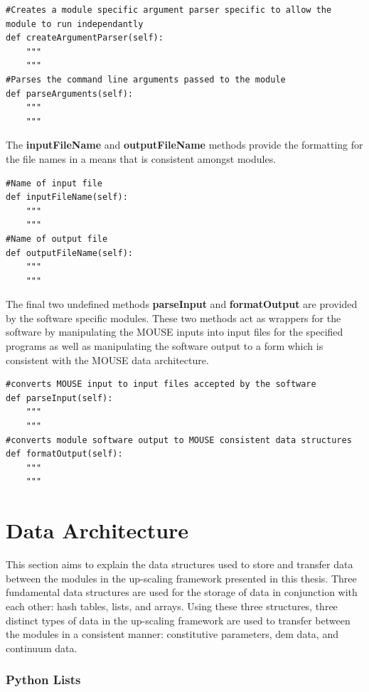 \begin{lstlisting}[frame=single] 
#Creates a module specific argument parser specific to allow the module to run independantly   
def createArgumentParser(self):
	"""
	"""
#Parses the command line arguments passed to the module
def parseArguments(self):
	"""
	"""
\end{lstlisting}

The \textbf{inputFileName} and \textbf{outputFileName} methods provide the formatting for the file names in a means that is consistent amongst modules.

\begin{lstlisting}[frame=single]
#Name of input file
def inputFileName(self):
	"""
	"""
#Name of output file
def outputFileName(self):
	"""
	"""
\end{lstlisting}

The final two undefined methods \textbf{parseInput} and \textbf{formatOutput} are provided by the software specific modules. These two methods act as wrappers for the software by manipulating the MOUSE inputs into input files for the specified programs as well as manipulating the software output to a form which is consistent with the MOUSE data architecture.

\begin{lstlisting}[frame=single]
#converts MOUSE input to input files accepted by the software
def parseInput(self):
	"""
	"""
#converts module software output to MOUSE consistent data structures
def formatOutput(self):
	"""
	"""
\end{lstlisting}

\section{Data Architecture}

This section aims to explain the data structures used to store and transfer data between the modules in the up-scaling framework presented in this thesis.  Three fundamental data structures are used for the storage of data in conjunction with each other: hash tables, lists, and arrays. Using these three structures, three distinct types of data in the up-scaling framework are used to transfer between the modules in a consistent manner: constitutive parameters, \acrshort{dem} data, and continuum data.

\subsubsection*{Python Lists}

